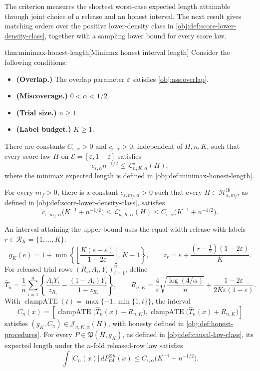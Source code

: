 \documentclass[11pt]{article}
\begin{document}
The criterion  measures the shortest worst-case expected length attainable through joint choice of a release and an honest interval. The next result gives matching orders over the positive lower-density class in \cref{obj:def:score-lower-density-class}, together with a sampling lower bound for every score law.

\begin{theoremv}{thm:minimax-honest-length}[Minimax honest interval length]
Consider the following conditions:
\begin{itemize}
\item \textbf{(Overlap.)} The overlap parameter \(\varepsilon\) satisfies \cref{obj:ass:overlap}.
\item \textbf{(Miscoverage.)} \(0<\alpha<1/2\).
\item \textbf{(Trial size.)} \(n\geq1\).
\item \textbf{(Label budget.)} \(K\geq1\).
\end{itemize}
There are constants \(C_{\varepsilon,\alpha}>0\) and \(c_{\varepsilon,\alpha}>0\), independent of \(H,n,K\), such that every score law \(H\) on \(\mathcal E=[\varepsilon,1-\varepsilon]\) satisfies
\[
c_{\varepsilon,\alpha}n^{-1/2}
\leq \mathcal L^\star_{n,K,\alpha}(H),
\]
where the minimax expected length is defined in \cref{obj:def:minimax-honest-length}.

For every \(m_f>0\), there is a constant \(c_{\varepsilon,m_f,\alpha}>0\) such that every \(H\in\mathcal H^{\mathrm{lb}}_{\varepsilon,m_f}\), as defined in \cref{obj:def:score-lower-density-class}, satisfies
\[
c_{\varepsilon,m_f,\alpha}\bigl(K^{-1}+n^{-1/2}\bigr)
\leq \mathcal L^\star_{n,K,\alpha}(H)
\leq C_{\varepsilon,\alpha}\bigl(K^{-1}+n^{-1/2}\bigr).
\]

An interval attaining the upper bound uses the equal-width release with labels \(r\in\mathcal R_K=\{1,\ldots,K\}\):
\[
g_K(e)=1+\min\left\{\left\lfloor\frac{K(e-\varepsilon)}{1-2\varepsilon}\right\rfloor,K-1\right\},
\qquad
z_r=\varepsilon+\frac{(r-\tfrac12)(1-2\varepsilon)}{K}.
\]
For released trial rows \((R_i,A_i,Y_i)_{i=1}^n\), define
\[
\widehat T_n=\frac1n\sum_{i=1}^n
\left\{\frac{A_iY_i}{z_{R_i}}-\frac{(1-A_i)Y_i}{1-z_{R_i}}\right\},
\qquad
R_{n,K}=\frac4\varepsilon\sqrt{\frac{\log(4/\alpha)}{n}}
+\frac{1-2\varepsilon}{2K\varepsilon(1-\varepsilon)}.
\]
With \(\operatorname{clampATE}(t)=\max\{-1,\min\{1,t\}\}\), the interval
\[
C_n(x)=
\left[
\operatorname{clampATE}\bigl(\widehat T_n(x)-R_{n,K}\bigr),
\operatorname{clampATE}\bigl(\widehat T_n(x)+R_{n,K}\bigr)
\right]
\]
satisfies \((g_K,C_n)\in\mathcal J_{n,K,\alpha}(H)\), with honesty defined in \cref{obj:def:honest-procedures}. For every \(P\in\mathfrak P(H,g_K)\), as defined in \cref{obj:def:causal-law-class}, its expected length under the \(n\)-fold released-row law satisfies
\[
\int |C_n(x)|\,dP_{\mathrm{rel}}^{\otimes n}(x)
\leq C_{\varepsilon,\alpha}\bigl(K^{-1}+n^{-1/2}\bigr).
\]
\end{theoremv}
\end{document}
